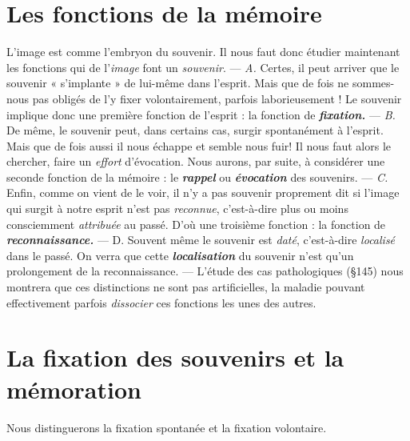 \section{Les fonctions de la mémoire}%
L'image est comme
l'embryon du souvenir. Il nous faut donc étudier maintenant les
fonctions qui de l’{\it image} font un {\it souvenir}. — {\it A.} Certes, il peut arriver
que le souvenir « s’implante » de lui-même dans l'esprit. Mais que de fois
ne sommes-nous pas obligés de l’y fixer volontairement, parfois laborieusement !
Le souvenir implique donc une première fonction de
l'esprit : la fonction de \textbf{\textit {fixation.}} — {\it B.} De même, le souvenir peut,
dans certains cas, surgir spontanément à l'esprit. Mais que de fois
aussi il nous échappe et semble nous fuir! Il nous faut alors le chercher,
faire un {\it effort} d’évocation. Nous aurons, par suite, à considérer une
seconde fonction de la mémoire : le \textbf{\textit {rappel}} ou \textbf{\textit {évocation}} des souvenirs.
— {\it C.} Enfin, comme on vient de le voir, il n’y a pas souvenir proprement
dit si l’image qui surgit à notre esprit n’est pas {\it reconnue}, c’est-à-dire
plus ou moins consciemment {\it attribuée} au passé. D'où une
troisième fonction : la fonction de \textbf{\textit {reconnaissance.}} — D. Souvent
même le souvenir est {\it daté}, c’est-à-dire {\it localisé} dans le passé. On verra
que cette \textbf{\textit {localisation}} du souvenir n’est qu’un prolongement de la
reconnaissance. — L'étude des cas pathologiques (\S 145) nous montrera
que ces distinctions ne sont pas artificielles, la maladie pouvant
effectivement parfois {\it dissocier} ces fonctions les unes des autres.

\section{La fixation des souvenirs et la mémoration}%
Nous
distinguerons la fixation spontanée et la fixation volontaire.

